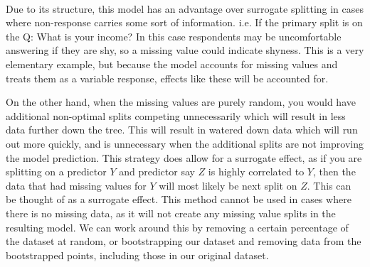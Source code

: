 \documentclass[11pt]{article}
\begin{document}
\begin{center}

\ \\
\end{center}


\vspace{5 mm}
\noindent
Due to its structure, this model has an advantage over surrogate splitting in 
cases where non-response carries some sort of information.  i.e. If the primary 
split is on the Q: What is your income? In this case respondents may be 
uncomfortable answering if they are shy, so a missing value could indicate 
shyness.  This is a very elementary example, but because the model accounts for 
missing values and treats them as a variable response, effects like these will 
be accounted for.  

\vspace{5 mm}
\noindent
On the other hand, when the missing values are purely random, you would have additional 
non-optimal splits competing unnecessarily which will result in less data 
further down the tree.  This will result in watered down data which will run 
out more quickly, and is unnecessary when the additional splits are not 
improving the model prediction.  This strategy does allow for a surrogate 
effect, as if you are splitting on a predictor $Y$ and predictor say  $Z$ is highly 
correlated to $Y$, then the data that had missing values for $Y$ will most 
likely be next split on $Z$.  This can be thought of as a surrogate effect.  
This method cannot be used in cases where there is no missing data, as it will 
not create any missing value splits in the resulting model.  We can work around 
this by removing a certain percentage of the dataset at random, or 
bootstrapping our dataset and removing data from the bootstrapped points, 
including those in our original dataset.
\end{document}
